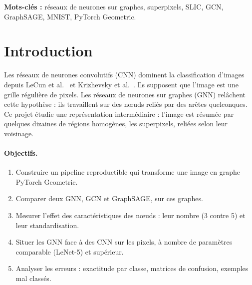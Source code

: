 \documentclass[11pt,a4paper]{article}
\begin{document}
\noindent\textbf{Mots-clés :} réseaux de neurones sur graphes, superpixels, SLIC, GCN, GraphSAGE, MNIST, PyTorch Geometric.

\vspace{0.5cm}
\noindent{}

\newpage
\tableofcontents
\newpage

\section{Introduction}

Les réseaux de neurones convolutifs (CNN) dominent la classification d'images depuis LeCun et
al.~\cite{lecun1998} et Krizhevsky et al.~\cite{krizhevsky2012}. Ils supposent que l'image est une grille régulière
de pixels. Les réseaux de neurones sur graphes (GNN) relâchent cette hypothèse : ils travaillent sur des nœuds reliés
par des arêtes quelconques. Ce projet étudie une représentation intermédiaire : l'image est résumée par quelques
dizaines de régions homogènes, les superpixels, reliées selon leur voisinage.

\paragraph{Objectifs.}
\begin{enumerate}
  \item Construire un pipeline reproductible qui transforme une image en graphe PyTorch Geometric.
  \item Comparer deux GNN, GCN et GraphSAGE, sur ces graphes.
  \item Mesurer l'effet des caractéristiques des nœuds : leur nombre (3 contre 5) et leur standardisation.
  \item Situer les GNN face à des CNN sur les pixels, à nombre de paramètres comparable (LeNet-5) et supérieur.
  \item Analyser les erreurs : exactitude par classe, matrices de confusion, exemples mal classés.
\end{enumerate}
\end{document}
